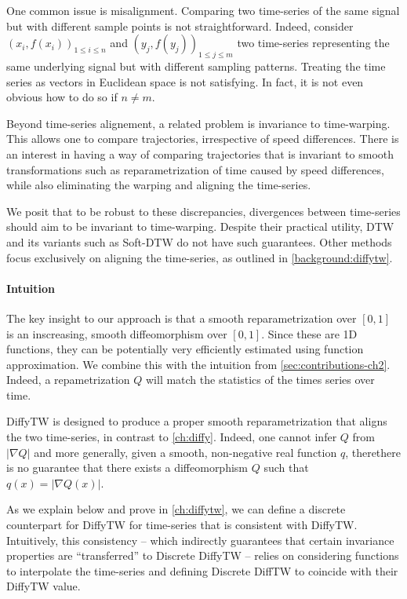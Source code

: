 One common issue is misalignment. Comparing two time-series of the same signal but with different sample points is not straightforward. Indeed, consider $(x_i, f(x_i))_{1\leq i\leq n}$ and $(y_j, f(y_j))_{1 \leq j \leq m}$ two time-series representing the same underlying signal but with different sampling patterns. Treating the time series as vectors in Euclidean space is not satisfying. In fact, it is not even obvious how to do so if $n \neq m$.

Beyond time-series alignement, a related problem is invariance to time-warping. This allows one to compare trajectories, irrespective of speed differences. There is an interest in having a way of comparing trajectories that is invariant to smooth transformations such as reparametrization of time caused by speed differences, while also eliminating the warping and aligning the time-series.

We posit that to be robust to these discrepancies, divergences between time-series should aim to be invariant to time-warping. Despite their practical utility, DTW \citep{dtw} and its variants such as Soft-DTW \citep{soft-dtw} do not have such guarantees. Other methods focus exclusively on aligning the time-series, as outlined in \ref{background:diffytw}.

\paragraph{Intuition}
The key insight to our approach is that a smooth reparametrization over $[0,1]$ is an inscreasing, smooth diffeomorphism over $[0,1]$. Since these are 1D functions, they can be potentially very efficiently estimated using function approximation. We combine this with the intuition from \cref{sec:contributions-ch2}. Indeed, a repametrization $Q$ will match the statistics of the times series over time.

DiffyTW is designed to produce a proper smooth reparametrization that aligns the two time-series, in contrast to \cref{ch:diffy}. Indeed, one cannot infer $Q$ from $\vert \nabla Q\vert$ and more generally, given a smooth, non-negative real function $q$, therethere is no guarantee that there exists a diffeomorphism $Q$ such that $q(x) = \vert \nabla Q(x) \vert$.

As we explain below and prove in \cref{ch:diffytw}, we can define a discrete counterpart for DiffyTW for time-series that is consistent with DiffyTW. Intuitively, this consistency -- which indirectly guarantees that certain invariance properties are ``transferred'' to Discrete DiffyTW -- relies on considering functions to interpolate the time-series and defining Discrete DiffTW to coincide with their DiffyTW value.

